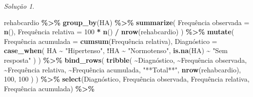 \documentclass[
]{latex/krantz}
\newenvironment{Shaded}{\begin{snugshade}}{\end{snugshade}}
\newcommand{\AttributeTok}[1]{\textcolor[rgb]{0.13,0.29,0.53}{#1}}
\newcommand{\DecValTok}[1]{\textcolor[rgb]{0.00,0.00,0.81}{#1}}
\newcommand{\FunctionTok}[1]{\textcolor[rgb]{0.13,0.29,0.53}{\textbf{#1}}}
\newcommand{\NormalTok}[1]{#1}
\newcommand{\OtherTok}[1]{\textcolor[rgb]{0.56,0.35,0.01}{#1}}
\newcommand{\SpecialCharTok}[1]{\textcolor[rgb]{0.81,0.36,0.00}{\textbf{#1}}}
\newcommand{\StringTok}[1]{\textcolor[rgb]{0.31,0.60,0.02}{#1}}
\theoremstyle{definition}
\theoremstyle{definition}
\theoremstyle{definition}
\theoremstyle{definition}
\theoremstyle{remark}
\newtheorem*{solution}{Solução}
\begin{document}
\begin{solution}
\begin{Shaded}
\begin{Highlighting}[]
\NormalTok{rehabcardio }\SpecialCharTok{\%\textgreater{}\%}
  \FunctionTok{group\_by}\NormalTok{(HA) }\SpecialCharTok{\%\textgreater{}\%}
  \FunctionTok{summarize}\NormalTok{(}
    \StringTok{\textasciigrave{}}\AttributeTok{Frequência observada}\StringTok{\textasciigrave{}} \OtherTok{=} \FunctionTok{n}\NormalTok{(),}
    \StringTok{\textasciigrave{}}\AttributeTok{Frequência relativa}\StringTok{\textasciigrave{}} \OtherTok{=} \DecValTok{100} \SpecialCharTok{*} \FunctionTok{n}\NormalTok{() }\SpecialCharTok{/} \FunctionTok{nrow}\NormalTok{(rehabcardio)}
\NormalTok{  ) }\SpecialCharTok{\%\textgreater{}\%}
  \FunctionTok{mutate}\NormalTok{(}
    \StringTok{\textasciigrave{}}\AttributeTok{Frequência acumulada}\StringTok{\textasciigrave{}} \OtherTok{=} \FunctionTok{cumsum}\NormalTok{(}\StringTok{\textasciigrave{}}\AttributeTok{Frequência relativa}\StringTok{\textasciigrave{}}\NormalTok{),}
    \StringTok{\textasciigrave{}}\AttributeTok{Diagnóstico}\StringTok{\textasciigrave{}} \OtherTok{=} \FunctionTok{case\_when}\NormalTok{(}
\NormalTok{      HA }\SpecialCharTok{\textasciitilde{}} \StringTok{"Hipertenso"}\NormalTok{,}
      \SpecialCharTok{!}\NormalTok{HA }\SpecialCharTok{\textasciitilde{}} \StringTok{"Normotenso"}\NormalTok{,}
      \FunctionTok{is.na}\NormalTok{(HA) }\SpecialCharTok{\textasciitilde{}} \StringTok{"Sem resposta"}
\NormalTok{    )}
\NormalTok{  ) }\SpecialCharTok{\%\textgreater{}\%}
  \FunctionTok{bind\_rows}\NormalTok{(}
    \FunctionTok{tribble}\NormalTok{(}
      \SpecialCharTok{\textasciitilde{}}\StringTok{\textasciigrave{}}\AttributeTok{Diagnóstico}\StringTok{\textasciigrave{}}\NormalTok{, }\SpecialCharTok{\textasciitilde{}}\StringTok{\textasciigrave{}}\AttributeTok{Frequência observada}\StringTok{\textasciigrave{}}\NormalTok{, }\SpecialCharTok{\textasciitilde{}}\StringTok{\textasciigrave{}}\AttributeTok{Frequência relativa}\StringTok{\textasciigrave{}}\NormalTok{,  }\SpecialCharTok{\textasciitilde{}}\StringTok{\textasciigrave{}}\AttributeTok{Frequência acumulada}\StringTok{\textasciigrave{}}\NormalTok{,}
      \StringTok{"**Total**"}\NormalTok{,  }\FunctionTok{nrow}\NormalTok{(rehabcardio),       }\DecValTok{100}\NormalTok{,                     }\DecValTok{100}
\NormalTok{    )}
\NormalTok{  ) }\SpecialCharTok{\%\textgreater{}\%}
  \FunctionTok{select}\NormalTok{(}\StringTok{\textasciigrave{}}\AttributeTok{Diagnóstico}\StringTok{\textasciigrave{}}\NormalTok{, }\StringTok{\textasciigrave{}}\AttributeTok{Frequência observada}\StringTok{\textasciigrave{}}\NormalTok{, }\StringTok{\textasciigrave{}}\AttributeTok{Frequência relativa}\StringTok{\textasciigrave{}}\NormalTok{, }\StringTok{\textasciigrave{}}\AttributeTok{Frequência acumulada}\StringTok{\textasciigrave{}}\NormalTok{) }\SpecialCharTok{\%\textgreater{}\%}

\end{Highlighting}
\end{Shaded}
\end{solution}
\end{document}
